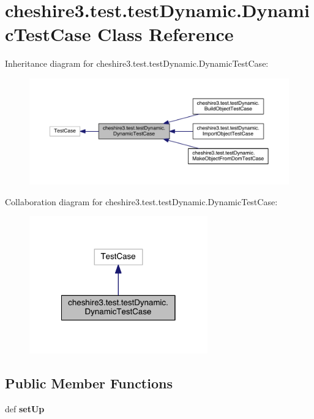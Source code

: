 \hypertarget{classcheshire3_1_1test_1_1test_dynamic_1_1_dynamic_test_case}{\section{cheshire3.\-test.\-test\-Dynamic.\-Dynamic\-Test\-Case Class Reference}
\label{classcheshire3_1_1test_1_1test_dynamic_1_1_dynamic_test_case}
}


Inheritance diagram for cheshire3.\-test.\-test\-Dynamic.\-Dynamic\-Test\-Case\-:
\nopagebreak
\begin{figure}[H]
\begin{center}
\leavevmode
\includegraphics[width=350pt]{classcheshire3_1_1test_1_1test_dynamic_1_1_dynamic_test_case__inherit__graph}
\end{center}
\end{figure}


Collaboration diagram for cheshire3.\-test.\-test\-Dynamic.\-Dynamic\-Test\-Case\-:
\nopagebreak
\begin{figure}[H]
\begin{center}
\leavevmode
\includegraphics[width=218pt]{classcheshire3_1_1test_1_1test_dynamic_1_1_dynamic_test_case__coll__graph}
\end{center}
\end{figure}
\subsection*{Public Member Functions}
\begin{DoxyCompactItemize}
\item 
\hypertarget{classcheshire3_1_1test_1_1test_dynamic_1_1_dynamic_test_case_a4dc344b5ee3e8e2502b5314ca6f81c50}{def {\bfseries set\-Up}}\label{classcheshire3_1_1test_1_1test_dynamic_1_1_dynamic_test_case_a4dc344b5ee3e8e2502b5314ca6f81c50}

\end{DoxyCompactItemize}
